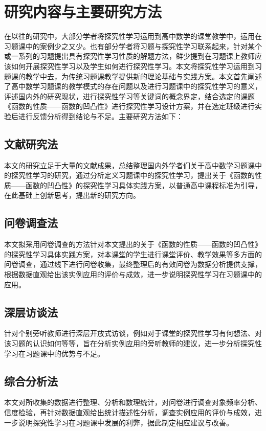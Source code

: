 \section{研究内容与主要研究方法}

在以往的研究中，大部分学者将探究性学习运用到高中数学的课堂教学中，运用在习题课中的案例少之又少。也有部分学者将习题与探究性学习联系起来，针对某个或一系列的习题提出具有探究性学习性质的解题方法，鲜少提到在习题课上教师应该如何开展探究性学习以及学生如何进行探究性学习。本文将探究性学习运用到习题课的教学中去，为传统习题课教学提供新的理论基础与实践方案。本文首先阐述了高中数学习题课的教学模式的存在问题以及进行习题课中的探究性学习的意义，评述国内外的研究现状，进行探究性学习等关键词的概念界定，结合选定的课题《函数的性质——函数的凹凸性》进行探究性学习设计方案，并在选定班级进行实验后进行反馈分析得到结论与不足。主要研究方法如下：


\subsection{文献研究法}

本文的研究立足于大量的文献成果，总结整理国内外学者们关于高中数学习题课中的探究性学习的研究，通过分析定义习题课中的探究性学习，提出关于《函数的性质——函数的凹凸性》的探究性学习具体实践方案，以普通高中课程标准为引导，在此基础上创新思考，提出新的研究方向。


\subsection{问卷调查法}

本文拟采用问卷调查的方法针对本文提出的关于《函数的性质——函数的凹凸性》的探究性学习具体实践方案，对本课堂的学生进行课堂评价、教学效果等多方面的问卷调查，通过线下进行问卷收集，最终整理后的有效问卷为数据分析提供支撑，根据数据直观给出该实例应用的评价与成效，进一步说明探究性学习在习题课中的应用。


\subsection{深层访谈法}

针对个别旁听教师进行深层开放式访谈，例如对于课堂的探究性学习有何想法、对该习题的认识如何等等，旨在分析实例应用的旁听教师的建议，进一步分析探究性学习在习题课中的优势与不足。


\subsection{综合分析法}

本文对所收集的数据进行整理、分析和数理统计，对问卷进行调查对象频率分析、信度检验，再针对数据直观给出统计描述性分析，调查实例应用的评价与成效，进一步说明探究性学习在习题课中发展的利弊，据此制定相应建议与改善。